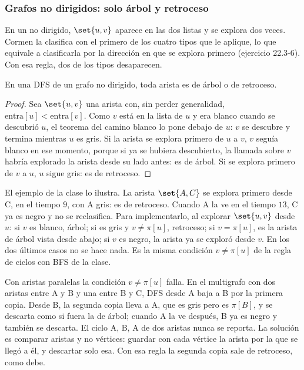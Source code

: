 \documentclass[11pt,letterpaper]{article}
\begin{document}
\subsubsection*{Grafos no dirigidos: solo árbol y retroceso}

En un no dirigido, $\set{u, v}$ aparece en las dos listas y se explora
dos veces. Cormen la clasifica con el primero de los cuatro tipos que
le aplique, lo que equivale a clasificarla por la dirección en que se
explora primero (ejercicio 22.3-6). Con esa regla, dos de los tipos
desaparecen.

\begin{teorema}
  \label{teo:busq-no-dirigido}
  En una DFS de un grafo no dirigido, toda arista es de árbol o de
  retroceso.
\end{teorema}

\begin{proof}
  Sea $\set{u, v}$ una arista con, sin perder generalidad,
  $\text{entra}[u] < \text{entra}[v]$. Como $v$ está en la lista de
  $u$ y era blanco cuando se descubrió $u$, el teorema del camino
  blanco lo pone debajo de $u$: $v$ se descubre y termina mientras $u$
  es gris. Si la arista se explora primero de $u$ a $v$, $v$ seguía
  blanco en ese momento, porque si ya se hubiera descubierto, la
  llamada sobre $v$ habría explorado la arista desde su lado antes: es
  de árbol. Si se explora primero de $v$ a $u$, $u$ sigue gris: es de
  retroceso.
\end{proof}

El ejemplo de la clase lo ilustra. La arista $\set{A, C}$ se explora
primero desde C, en el tiempo $9$, con A gris: es de retroceso. Cuando
A la ve en el tiempo $13$, C ya es negro y no se reclasifica. Para
implementarlo, al explorar $\set{u, v}$ desde $u$: si $v$ es blanco,
árbol; si es gris y $v \neq \pi[u]$, retroceso; si $v = \pi[u]$, es la
arista de árbol vista desde abajo; si $v$ es negro, la arista ya se
exploró desde $v$. En los dos últimos casos no se hace nada. Es la
misma condición $v \neq \pi[u]$ de la regla de ciclos con BFS de la
clase.

\begin{ojo}
  Con aristas paralelas la condición $v \neq \pi[u]$ falla. En el
  multigrafo con dos aristas entre A y B y una entre B y C, DFS desde
  A baja a B por la primera copia. Desde B, la segunda copia lleva a
  A, que es gris pero es $\pi[B]$, y se descarta como si fuera la de
  árbol; cuando A la ve después, B ya es negro y también se descarta.
  El ciclo A, B, A de dos aristas nunca se reporta. La solución es
  comparar aristas y no vértices: guardar con cada vértice la arista
  por la que se llegó a él, y descartar solo esa. Con esa regla la
  segunda copia sale de retroceso, como debe.
\end{ojo}
\end{document}
